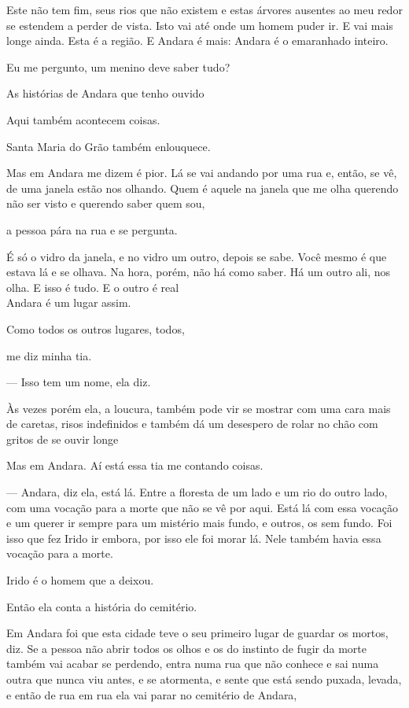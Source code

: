 Este não tem fim, seus rios que não existem e estas árvores ausentes ao
meu redor se estendem a perder de vista. Isto vai até onde um homem
puder ir. E vai mais longe ainda. Esta é a região. E Andara é mais:
Andara é o emaranhado inteiro.

Eu me pergunto, um menino deve saber tudo?

As histórias de Andara que tenho ouvido

Aqui também acontecem coisas.

Santa Maria do Grão também enlouquece.

Mas em Andara me dizem é pior. Lá se vai andando por uma rua e, então,
se vê, de uma janela estão nos olhando. Quem é aquele na janela que me
olha querendo não ser visto e querendo saber quem sou,

a pessoa pára na rua e se pergunta.

É só o vidro da janela, e no vidro um outro, depois se sabe. Você mesmo
é que estava lá e se olhava. Na hora, porém, não há como saber. Há um
outro ali, nos olha. E isso é tudo. E o outro é real\\

Andara é um lugar assim.

Como todos os outros lugares, todos,

me diz minha tia.

--- Isso tem um nome, ela diz.

Às vezes porém ela, a loucura, também pode vir se mostrar com uma cara
mais de caretas, risos indefinidos e também dá um desespero de rolar no
chão com gritos de se ouvir longe

Mas em Andara. Aí está essa tia me contando coisas.

--- Andara, diz ela, está lá. Entre a floresta de um lado e um rio do
outro lado, com uma vocação para a morte que não se vê por aqui. Está lá
com essa vocação e um querer ir sempre para um mistério mais fundo, e
outros, os sem fundo. Foi isso que fez Irido ir embora, por isso ele foi
morar lá. Nele também havia essa vocação para a morte.

Irido é o homem que a deixou.

Então ela conta a história do cemitério.

Em Andara foi que esta cidade teve o seu primeiro lugar de guardar os
mortos, diz. Se a pessoa não abrir todos os olhos e os do instinto de
fugir da morte também vai acabar se perdendo, entra numa rua que não
conhece e sai numa outra que nunca viu antes, e se atormenta, e sente
que está sendo puxada, levada, e então de rua em rua ela vai parar no
cemitério de Andara,

